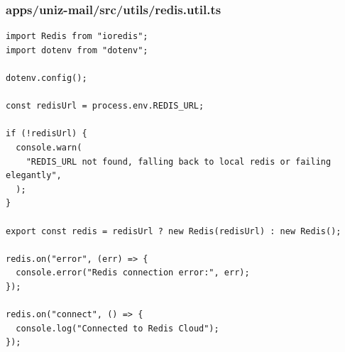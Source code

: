 \documentclass[11pt,a4paper,oneside]{article}
\begin{document}
\subsubsection*{apps/uniz-mail/src/utils/redis.util.ts}
\begin{lstlisting}
import Redis from "ioredis";
import dotenv from "dotenv";

dotenv.config();

const redisUrl = process.env.REDIS_URL;

if (!redisUrl) {
  console.warn(
    "REDIS_URL not found, falling back to local redis or failing elegantly",
  );
}

export const redis = redisUrl ? new Redis(redisUrl) : new Redis();

redis.on("error", (err) => {
  console.error("Redis connection error:", err);
});

redis.on("connect", () => {
  console.log("Connected to Redis Cloud");
});

\end{lstlisting}
\end{document}
